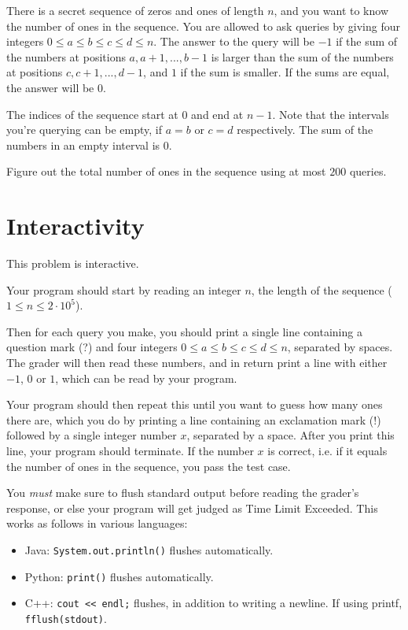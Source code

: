 There is a secret sequence of zeros and ones of length $n$, and you want to know the number of ones in the sequence.
You are allowed to ask queries by giving four integers $0 \leq a \leq b \leq c \leq d \leq n$.
The answer to the query will be $-1$ if the sum of the numbers at positions $a, a+1, ..., b-1$ is larger than the
sum of the numbers at positions $c, c+1, ..., d-1$, and $1$ if the sum is smaller.
If the sums are equal, the answer will be $0$.

The indices of the sequence start at $0$ and end at $n-1$.
Note that the intervals you're querying can be empty, if $a = b$ or $c = d$ respectively.
The sum of the numbers in an empty interval is $0$.

Figure out the total number of ones in the sequence using at most $200$ queries.

\section*{Interactivity}
This problem is interactive.

Your program should start by reading an integer $n$, the length of the sequence ($1 \le n \le 2 \cdot 10^5$).

Then for each query you make, you should print a single line containing a question mark (?) and
four integers $0 \leq a \leq b \leq c \leq d \leq n$, separated by spaces.
The grader will then read these numbers, and in return print a line with either $-1$, $0$ or $1$, which can be read by your program.

Your program should then repeat this until you want to guess how many ones there are,
which you do by printing a line containing an exclamation mark (!) followed by a single integer number $x$, separated by a space.
After you print this line, your program should terminate.
If the number $x$ is correct, i.e. if it equals the number of ones in the sequence, you pass the test case.

You \emph{must} make sure to flush standard output before reading the grader's response, or else your program
will get judged as Time Limit Exceeded. This works as follows in various languages:
\begin{itemize}
  \item Java: \texttt{System.out.println()} flushes automatically.
  \item Python: \texttt{print()} flushes automatically.
  \item C++: \texttt{cout << endl;} flushes, in addition to writing a newline. If using printf, \texttt{fflush(stdout)}.
\end{itemize}

